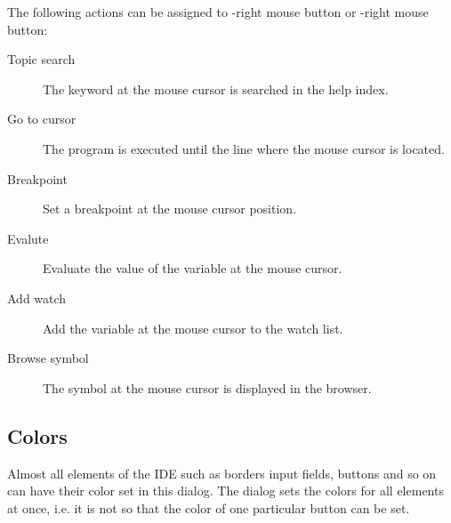 The following actions can be assigned to -right mouse button or
-right mouse button:
\begin{description}
\item [Topic search] The keyword at the mouse cursor is searched in the
help index.
\item [Go to cursor] The program is executed until the line where
the mouse cursor is located.
\item [Breakpoint] Set a breakpoint at the mouse cursor position.
\item [Evalute] Evaluate the value of the variable at the mouse
cursor.
\item [Add watch] Add the variable at the mouse cursor to the
watch list.
\item [Browse symbol] The symbol at the mouse cursor is displayed
in the browser.
\end{description}

%
%
\subsection{Colors}
\label{se:prefcolors}
Almost all elements of the IDE such as borders input fields, buttons and so
on can have their color set in this dialog. The dialog sets the colors for
all elements at once, i.e. it is not so that the color of one particular
button can be set.

